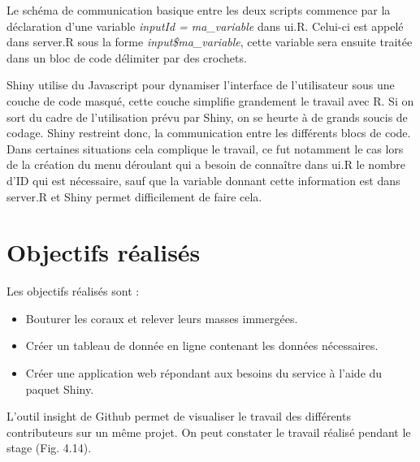 \documentclass[]{report}
\begin{document}
Le schéma de communication basique entre les deux scripts commence par
la déclaration d'une variable \emph{inputId = ma\_variable} dans ui.R.
Celui-ci est appelé dans server.R sous la forme
\emph{input\$ma\_variable}, cette variable sera ensuite traitée dans un
bloc de code délimiter par des crochets.

Shiny utilise du Javascript pour dynamiser l'interface de l'utilisateur
sous une couche de code masqué, cette couche simplifie grandement le
travail avec R. Si on sort du cadre de l'utilisation prévu par Shiny, on
se heurte à de grands soucis de codage. Shiny restreint donc, la
communication entre les différents blocs de code. Dans certaines
situations cela complique le travail, ce fut notamment le cas lors de la
création du menu déroulant qui a besoin de connaître dans ui.R le nombre
d'ID qui est nécessaire, sauf que la variable donnant cette information
est dans server.R et Shiny permet difficilement de faire cela.

\section{Objectifs réalisés}\label{objectifs-realises}

Les objectifs réalisés sont :

\begin{itemize}
\item
  Bouturer les coraux et relever leurs masses immergées.
\item
  Créer un tableau de donnée en ligne contenant les données nécessaires.
\item
  Créer une application web répondant aux besoins du service à l'aide du
  paquet Shiny.
\end{itemize}

L'outil insight de Github permet de visualiser le travail des différents
contributeurs sur un même projet. On peut constater le travail réalisé
pendant le stage (Fig. 4.14).
\end{document}
